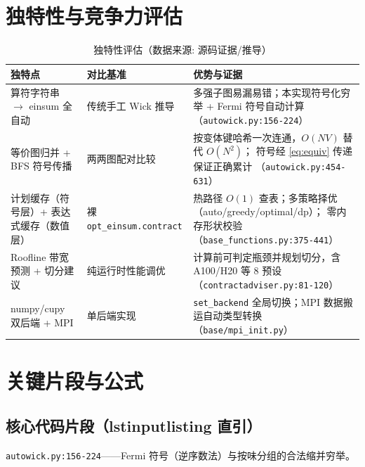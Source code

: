 \documentclass[UTF8]{ctexart}
\begin{document}
\section{独特性与竞争力评估}

\begin{table}[htbp]\centering
\begin{tabularx}{\textwidth}{lXX}
\toprule
\textcolor{algo}{独特点} & 对比基准 & 优势与证据 \\
\midrule
算符字符串 $\to$ einsum 全自动 & 传统手工 Wick 推导 &
多强子图易漏易错；本实现符号化穷举 + Fermi 符号自动计算
（\texttt{autowick.py:156-224}） \\
等价图归并 + BFS 符号传播 & 两两图配对比较 &
按变体键哈希一次连通，$O(NV)$ 替代 $O(N^2)$；
符号经 \eqref{eq:equiv} 传递保证正确累计
（\texttt{autowick.py:454-631}） \\
计划缓存（符号层）+ 表达式缓存（数值层） &
裸 \texttt{opt\_einsum.contract} &
热路径 $O(1)$ 查表；多策略择优（auto/greedy/optimal/dp）；
零内存形状校验（\nolinkurl{base_functions.py:375-441}） \\
Roofline 带宽预测 + 切分建议 &
纯运行时性能调优 &
计算前可判定瓶颈并规划切分，含 A100/H20 等 8 预设
（\nolinkurl{contractadviser.py:81-120}） \\
numpy/cupy 双后端 + MPI &
单后端实现 &
\nolinkurl{set_backend} 全局切换；MPI 数据搬运自动类型转换
（\nolinkurl{base/mpi_init.py}） \\
\bottomrule
\end{tabularx}
\caption{独特性评估（数据来源: 源码证据/推导）}
\end{table}

\section{关键片段与公式}

\subsection{核心代码片段（lstinputlisting 直引）}


\vspace{0.5em}

{\small \texttt{autowick.py:156-224}——Fermi 符号（逆序数法）与按味分组的合法缩并穷举。}
\end{document}
